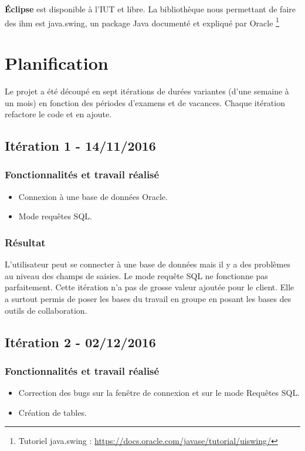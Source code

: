 \textbf{Éclipse} est disponible à l'IUT et libre.
La bibliothèque nous permettant de faire des \gls{ihm} est java.swing, un package Java documenté et expliqué par Oracle
\footnote{Tutoriel java.swing : \url{https://docs.oracle.com/javase/tutorial/uiswing/}}

\section{Planification}
Le projet a été découpé en sept itérations de durées variantes (d'une semaine à un mois) en fonction des périodes d'examens et de vacances. 
Chaque itération refactore le code et en ajoute.

\subsection{Itération 1 - 14/11/2016}

\subsubsection{Fonctionnalités et travail réalisé}
\begin{itemize}
\item Connexion à une base de données Oracle.
\item Mode requêtes SQL.
\end{itemize}

\subsubsection{Résultat}
L'utilisateur peut se connecter à une base de données mais il y a des problèmes au niveau des champs de saisies. 
Le mode requête SQL ne fonctionne pas parfaitement.
Cette itération n'a pas de grosse valeur ajoutée pour le client. 
Elle a surtout permis de poser les bases du travail en groupe en posant les bases des outils de collaboration.


\subsection{Itération 2 - 02/12/2016}
\subsubsection{Fonctionnalités et travail réalisé}
\begin{itemize}
\item Correction des bugs sur la fenêtre de connexion et sur le mode Requêtes SQL.
\item Création de tables.
\end{itemize}

